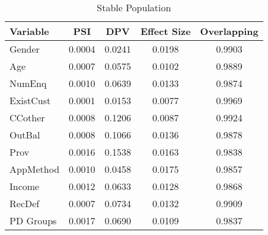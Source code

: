 \documentclass{article}
\theoremstyle{def}
\begin{document}

\begin{table}[!htbp!]%
\caption{Stable Population}
\label{tabl:Stable_Pop}
\centering
\small
\begin{tabular}{lcccc}
\hline
Variable & PSI & DPV & Effect Size & Overlapping \\
\hline
Gender & 0.0004 & 0.0241 & 0.0198 & 0.9903\\
Age & 0.0007 & 0.0575 & 0.0102 & 0.9889\\
NumEnq & 0.0010 & 0.0639 & 0.0133 & 0.9874\\
ExistCust & 0.0001 & 0.0153 & 0.0077 & 0.9969\\
CCother & 0.0008 & 0.1206 & 0.0087 & 0.9924\\
OutBal & 0.0008 & 0.1066 & 0.0136 & 0.9878\\
Prov & 0.0016 & 0.1538 & 0.0163 & 0.9838\\
AppMethod & 0.0010 & 0.0458 & 0.0175 & 0.9857\\
Income & 0.0012 & 0.0633 & 0.0128 & 0.9868\\
RecDef & 0.0007 & 0.0734 & 0.0132 & 0.9909\\
\hline 
PD Groups & 0.0017 & 0.0690 & 0.0109 & 0.9837\\
\hline
\end{tabular}
\end{table}
\end{document}

